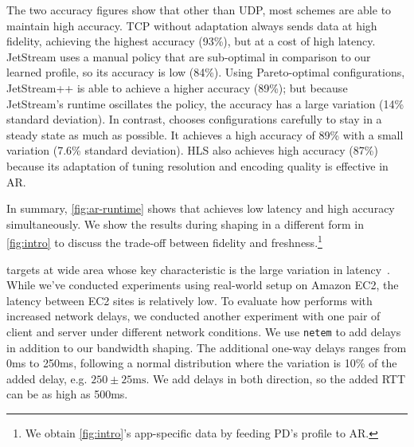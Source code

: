 The two accuracy figures show that other than UDP, most schemes are able to
maintain high accuracy. TCP without adaptation always sends data at high
fidelity, achieving the highest accuracy (93\%), but at a cost of high
latency. JetStream uses a manual policy that are sub-optimal in comparison to
our learned profile, so its accuracy is low (84\%). Using Pareto-optimal
configurations, JetStream++ is able to achieve a higher accuracy (89\%); but
because JetStream's runtime oscillates the policy, the accuracy has a large
variation (14\% standard deviation). In contrast, \sysname{} chooses
configurations carefully to stay in a steady state as much as possible.  It
achieves a high accuracy of 89\% with a small variation (7.6\% standard
deviation). HLS also achieves high accuracy (87\%) because its adaptation of
tuning resolution and encoding quality is effective in AR.


In summary, \autoref{fig:ar-runtime} shows that \sysname{} achieves low latency
and high accuracy simultaneously. We show the results during shaping in a
different form in \autoref{fig:intro} to discuss the trade-off between fidelity
and freshness.\footnote{We obtain \autoref{fig:intro}'s app-specific data by
  feeding PD's profile to AR.}

 \sysname{} targets at wide area
whose key characteristic is the large variation in
latency~\cite{li2010cloudcmp}. While we've conducted experiments using
real-world setup on Amazon EC2, the latency between EC2 sites is relatively low.
To evaluate how \sysname{} performs with increased network delays, we conducted
another experiment with one pair of client and server under different network
conditions. We use \texttt{netem} to add delays in addition to our bandwidth
shaping. The additional one-way delays ranges from 0ms to 250ms, following a
normal distribution where the variation is 10\% of the added delay, e.g.
$250\pm 25\text{ms}$. We add delays in both direction, so the added RTT can be
as high as 500ms.

